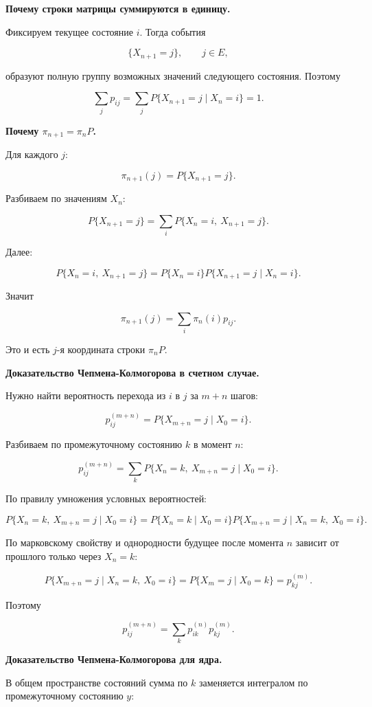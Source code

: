 \documentclass[
  11pt,
  a4paper,
]{article}
\begin{document}
\textbf{Почему строки матрицы суммируются в единицу.}

Фиксируем текущее состояние \(i\). Тогда события

\[
\{X_{n+1}=j\},
\qquad
j\in E,
\]

образуют полную группу возможных значений следующего состояния. Поэтому

\[
\sum_jp_{ij}
=
\sum_jP\{X_{n+1}=j\mid X_n=i\}
=
1.
\]

\textbf{Почему \(\pi_{n+1}=\pi_nP\).}

Для каждого \(j\):

\[
\pi_{n+1}(j)
=
P\{X_{n+1}=j\}.
\]

Разбиваем по значениям \(X_n\):

\[
P\{X_{n+1}=j\}
=
\sum_iP\{X_n=i,\ X_{n+1}=j\}.
\]

Далее:

\[
P\{X_n=i,\ X_{n+1}=j\}
=
P\{X_n=i\}P\{X_{n+1}=j\mid X_n=i\}.
\]

Значит

\[
\pi_{n+1}(j)=\sum_i\pi_n(i)p_{ij}.
\]

Это и есть \(j\)-я координата строки \(\pi_nP\).

\textbf{Доказательство Чепмена-Колмогорова в счетном случае.}

Нужно найти вероятность перехода из \(i\) в \(j\) за \(m+n\) шагов:

\[
p_{ij}^{(m+n)}
=
P\{X_{m+n}=j\mid X_0=i\}.
\]

Разбиваем по промежуточному состоянию \(k\) в момент \(n\):

\[
p_{ij}^{(m+n)}
=
\sum_k
P\{X_n=k,\ X_{m+n}=j\mid X_0=i\}.
\]

По правилу умножения условных вероятностей:

\[
P\{X_n=k,\ X_{m+n}=j\mid X_0=i\}
=
P\{X_n=k\mid X_0=i\}
P\{X_{m+n}=j\mid X_n=k,\ X_0=i\}.
\]

По марковскому свойству и однородности будущее после момента \(n\)
зависит от прошлого только через \(X_n=k\):

\[
P\{X_{m+n}=j\mid X_n=k,\ X_0=i\}
=
P\{X_m=j\mid X_0=k\}
=
p_{kj}^{(m)}.
\]

Поэтому

\[
p_{ij}^{(m+n)}
=
\sum_k p_{ik}^{(n)}p_{kj}^{(m)}.
\]

\textbf{Доказательство Чепмена-Колмогорова для ядра.}

В общем пространстве состояний сумма по \(k\) заменяется интегралом по
промежуточному состоянию \(y\):
\end{document}
